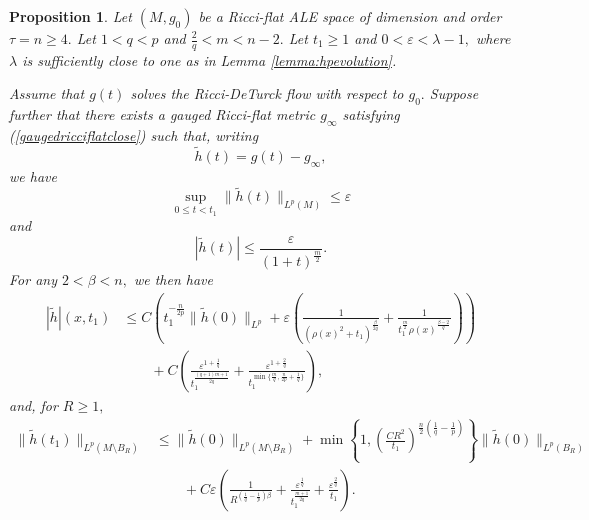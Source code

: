 \documentclass[12pt]{amsart}
\newcommand{\LB}{\left[}
\newcommand{\RB}{\right]}
\renewcommand{\1}{{\mathbf 1}}
\newcommand{\eps}{{\varepsilon}}
\newtheorem{prop}[thm]{Proposition}
\theoremstyle{others}
\numberwithin{equation}{section}
\begin{document}
\begin{prop}\label{prop:smallpLpbootstrap} %
Let $(M, g_0)$ be a Ricci-flat ALE space of dimension and order $\tau = n \geq 4.$ Let $1 < q < p$ and $\frac{2}{q} < m < n - 2.$ Let $t_1 \geq 1$ and $0 < \eps < \lambda - 1,$ where $\lambda$ is sufficiently close to one as in Lemma \ref{lemma:hpevolution}. 

Assume that $g(t)$ solves the Ricci-DeTurck flow with respect to $g_0.$ Suppose further that there exists a gauged Ricci-flat metric $g_\infty$ satisfying (\ref{gaugedricciflatclose}) such that, writing
$$\tilde{h}(t) = g(t) - g_\infty,$$
we have
      \begin{equation}\label{smallpLpbootstrap:hLpestimate}
        \sup_{0 \leq t < t_1} \| \tilde{h}(t) \|_{L^p(M)} \leq \eps
    \end{equation}
     and
\begin{equation}\label{smallpLpbootstrap:hLinftyassn}
        | \tilde{h}(t) | \leq \frac{ \eps }{ (1 + t)^{\frac{m}{2}} }.
    \end{equation}
For any $2 < \beta < n,$ we then have
\begin{equation}\label{smallpLpbootstrap:Linftybound}
\begin{split}
    |\tilde{h}|(x,t_1) & \leq C \left( t_1^{-\frac{n}{2p}} \| \tilde{h}(0) \|_{L^p} + \eps \left( \frac{1}{ \left( \rho(x)^2 + t_1 \right)^{\frac{\beta}{2q}} }  + \frac{1}{t_1^{\frac{m}{2}} \rho(x)^{\frac{\beta - 2}{q}}} \right) \right) \\
    & \qquad + C \left( \frac{\eps^{1 + \frac{1}{q}} }{t_1^{\frac{(q + 1)m + 1}{2q}} }  + \frac{ \eps^{1 + \frac{2}{q} }}{t_1^{\min\{ \frac{m}{q}, \frac{n}{2p} + \frac{1}{q} \}}} \right),
    \end{split}
\end{equation}
and, for $R \geq 1,$
        \begin{equation}\label{smallpLpbootstrap:Lpbound}
        \begin{split}
        \|\tilde{h}(t_1) \|_{L^p(M \setminus B_R)} & \leq \|\tilde{h}(0) \|_{L^p ( M \setminus B_R )} + \min \left\{ 1, \left( \frac{C R^2}{t_1 } \right)^{\frac{n}{2}\left( \frac{1}{q} - \frac{1}{p} \right)} \right\} \|\tilde{h}(0)\|_{L^p(B_R)} \\
        & \qquad + C \eps \left( \frac{1}{R^{\left( \frac{1}{q} - \frac{1}{p} \right) \beta } } + \frac{\eps^{\frac{1}{q}}}{ t_1^{\frac{m + 1}{2q}} } + \frac{\eps^{\frac{2}{q}} }{t_1} \right).
        \end{split}
    \end{equation}
\end{prop}
\end{document}

